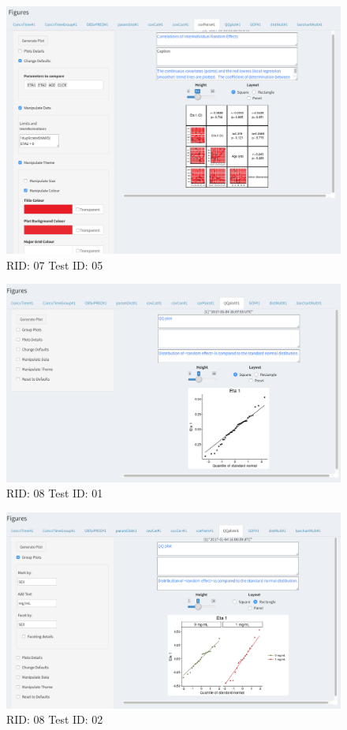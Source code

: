 \begin{figure}[H]
\includegraphics[width=.8\textwidth]{screencaps/07-05-1.png}
\caption{RID: 07 Test ID: 05}
\end{figure}
\begin{figure}[H]
\includegraphics[width=.8\textwidth]{screencaps/08-01-1.png}
\caption{RID: 08 Test ID: 01}
\end{figure}
\begin{figure}[H]
\includegraphics[width=.8\textwidth]{screencaps/08-02-1.png}
\caption{RID: 08 Test ID: 02}
\end{figure}
